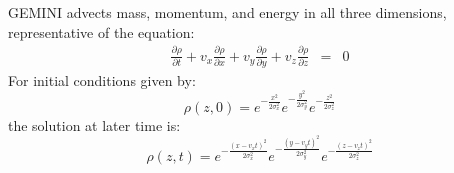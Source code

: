 \documentclass[11pt,letterpaper]{article}
\begin{document}
GEMINI advects mass, momentum, and energy in all three dimensions, representative of the equation:  
\begin{eqnarray}
\frac{\partial \rho}{\partial t} + v_x \frac{\partial \rho}{\partial x} + v_y \frac{\partial \rho}{\partial y} + v_z \frac{\partial \rho}{\partial z} &=& 0 %
\end{eqnarray}
For initial conditions given by:
\begin{equation}
\rho(z,0)=e^{-\frac{x^2}{2 \sigma_x^2}}e^{-\frac{y^2}{2 \sigma_y^2}}e^{-\frac{z^2}{2 \sigma_z^2}}
\end{equation}
the solution at later time is:
\begin{equation}
\rho(z,t)=e^{-\frac{(x-v_x t)^2}{2 \sigma_x^2}}e^{-\frac{(y - v_y t)^2}{2 \sigma_y^2}}e^{-\frac{(z-v_z t)^2}{2 \sigma_z^2}}
\end{equation}


\pagebreak

%
\end{document}
